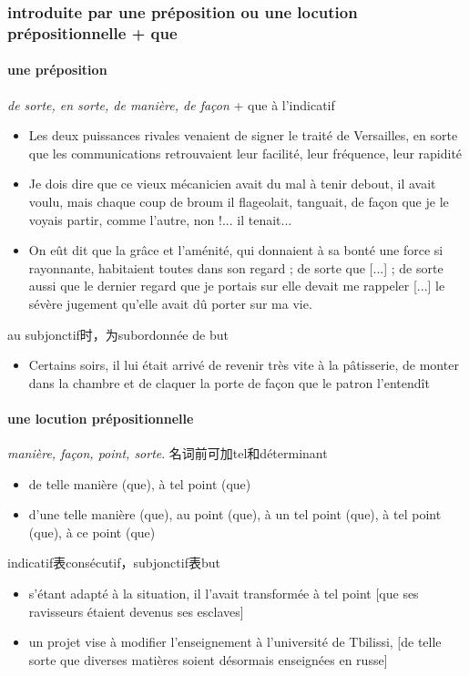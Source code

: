 \documentclass[UTF8]{report}
\begin{document}
\subsubsection{introduite par une préposition ou une locution prépositionnelle + que}
\paragraph{une préposition}
\textit{de sorte, en sorte, de manière, de façon} + que à l’indicatif
\begin{itemize}
    \item Les deux puissances rivales venaient de signer le traité de Versailles, en sorte que les communications retrouvaient leur facilité, leur fréquence, leur rapidité 
    \item Je dois dire que ce vieux mécanicien avait du mal à tenir debout, il avait voulu, mais chaque coup de broum il flageolait, tanguait, de façon que je le voyais partir, comme l’autre, non !... il tenait...
    \item On eût dit que la grâce et l’aménité, qui donnaient à sa bonté une force si rayonnante, habitaient toutes dans son regard ; de sorte que [...] ; de sorte aussi que le dernier regard que je portais sur elle devait me rappeler [...] le sévère jugement qu’elle avait dû porter sur ma vie.
\end{itemize}
au subjonctif时，为subordonnée de but
\begin{itemize}
    \item Certains soirs, il lui était arrivé de revenir très vite à la pâtisserie, de monter dans la chambre et de claquer la porte de façon que le patron l’entendît 
\end{itemize}


\paragraph{une locution prépositionnelle}
\textit{manière, façon, point, sorte}. 名词前可加tel和déterminant
\begin{itemize}
    \item de telle manière (que), à tel point (que)
    \item d’une telle manière (que), au point (que), à un tel point (que), à tel point (que), à ce point (que)
\end{itemize}
indicatif表consécutif，subjonctif表but
\begin{itemize}
    \item s’étant adapté à la situation, il l’avait transformée à tel point [que ses ravisseurs étaient devenus ses esclaves] 
    \item un projet vise à modifier l’enseignement à l’université de Tbilissi, [de telle sorte que diverses matières soient désormais enseignées en russe] 
\end{itemize}
\end{document}
